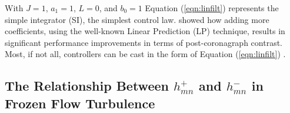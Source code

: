 \documentclass[10pt,preprint]{aastex631}
\begin{document}
With $J=1$, $a_1 = 1$, $L=0$, and $b_0 = 1$ Equation (\ref{eqn:linfilt}) represents the simple integrator (SI), the simplest control law.  \citet{2018JATIS...4a9001M} showed how adding more coefficients, using the well-known Linear Prediction (LP) technique, results in significant performance improvements in terms of post-coronagraph contrast.  Most, if not all, controllers can be cast in the form of Equation (\ref{eqn:linfilt}) \citep{2007JOSAA..24.2645P}. 



% 
% 
% 

\subsection{The Relationship Between $h_{mn}^+$ and $h_{mn}^-$ in Frozen Flow Turbulence}
\end{document}
